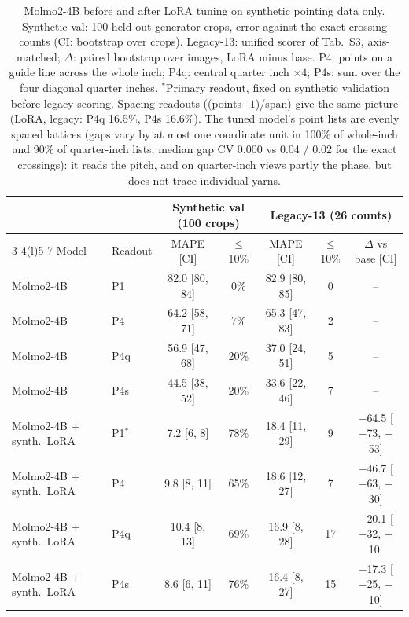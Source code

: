 \begin{table}[t]
\centering
\footnotesize
\setlength{\tabcolsep}{2pt}
\begin{tabular}{@{}llccccc@{}}
\toprule
 & & \multicolumn{2}{c}{Synthetic val (100 crops)} & \multicolumn{3}{c}{Legacy-13 (26 counts)} \\
\cmidrule(lr){3-4}\cmidrule(l){5-7}
Model & Readout & MAPE [CI] & $\le$10\% & MAPE [CI] & $\le$10\% & $\Delta$ vs base [CI] \\
\midrule
Molmo2-4B & P1 & 82.0 [80, 84] & 0\% & 82.9 [80, 85] & 0 & -- \\
Molmo2-4B & P4 & 64.2 [58, 71] & 7\% & 65.3 [47, 83] & 2 & -- \\
Molmo2-4B & P4q & 56.9 [47, 68] & 20\% & 37.0 [24, 51] & 5 & -- \\
Molmo2-4B & P4s & 44.5 [38, 52] & 20\% & 33.6 [22, 46] & 7 & -- \\
\midrule
Molmo2-4B + synth.\ LoRA & P1$^\ast$ & 7.2 [6, 8] & 78\% & 18.4 [11, 29] & 9 & $-$64.5 [$-$73, $-$53] \\
Molmo2-4B + synth.\ LoRA & P4 & 9.8 [8, 11] & 65\% & 18.6 [12, 27] & 7 & $-$46.7 [$-$63, $-$30] \\
Molmo2-4B + synth.\ LoRA & P4q & 10.4 [8, 13] & 69\% & 16.9 [8, 28] & 17 & $-$20.1 [$-$32, $-$10] \\
Molmo2-4B + synth.\ LoRA & P4s & 8.6 [6, 11] & 76\% & 16.4 [8, 27] & 15 & $-$17.3 [$-$25, $-$10] \\
\bottomrule
\end{tabular}
\caption{Molmo2-4B before and after LoRA tuning on synthetic pointing data only. Synthetic val: 100 held-out generator crops, error against the exact crossing counts (CI: bootstrap over crops). Legacy-13: unified scorer of Tab.~S3, axis-matched; $\Delta$: paired bootstrap over images, LoRA minus base. P4: points on a guide line across the whole inch; P4q: central quarter inch $\times4$; P4s: sum over the four diagonal quarter inches. $^\ast$Primary readout, fixed on synthetic validation before legacy scoring. Spacing readouts ((points$-1$)/span) give the same picture (LoRA, legacy: P4q 16.5\%, P4s 16.6\%). The tuned model's point lists are evenly spaced lattices (gaps vary by at most one coordinate unit in 100\% of whole-inch and 90\% of quarter-inch lists; median gap CV 0.000 vs 0.04 / 0.02 for the exact crossings): it reads the pitch, and on quarter-inch views partly the phase, but does not trace individual yarns.}
\label{tab:supp_ft}
\end{table}
